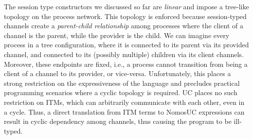The session type constructors we discussed so far are \emph{linear} and impose a tree-like topology
on the process network.
This topology is enforced because session-typed channels create a \emph{parent-child relationship} among processes
where the client of a channel is the parent, while the provider is the child.
We can imagine every process in a tree configuration, where it is connected to its parent via its provided channel,
and connected to its (possibly multiple) children via its client channels.
Moreover, these endpoints are fixed, i.e., a process cannot transition from being a client of
a channel to its provider, or vice-versa.
Unfortunately, this places a strong restriction on the expressiveness of the language and precludes practical
programming scenarios where a cyclic topology is required.
UC places no such restriction on ITMs, which can arbitrarily communicate with each other, even in a cycle.
Thus, a direct translation from ITM terms to NomosUC expressions can result in cyclic
dependency among channels, thus causing the program to be ill-typed.

